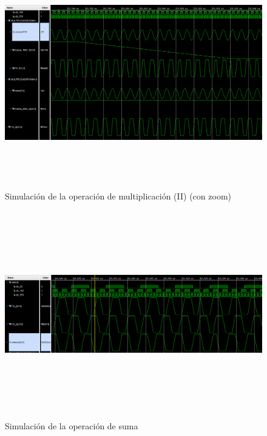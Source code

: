 \begin{figure}
    \centering
    \includegraphics[width=1\textwidth,height=10cm]{img/simu/mult2.PNG}
    \caption{Simulación de la operación de multiplicación (II) (con zoom)}
    \label{fig:mult2}
\end{figure}

\clearpage

\begin{figure}
    \centering
    \includegraphics[width=1\textwidth,height=9cm]{img/simu/suma.PNG}
    \caption{Simulación de la operación de suma}
    \label{fig:suma}
\end{figure}

 
